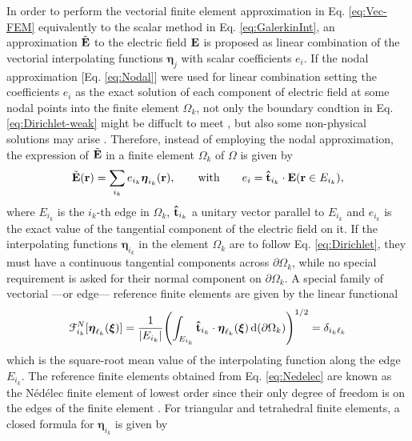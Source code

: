 
 In order to perform the vectorial finite element approximation in Eq. \eqref{eq:Vec-FEM} equivalently to the scalar method in Eq. \eqref{eq:GalerkinInt}, an approximation $\tilde{\vb{E}}$ to the electric field $\vb{E}$ is proposed as linear combination of the vectorial interpolating functions $\boldsymbol{\eta}_j$ with scalar coefficients $e_i$. If the nodal approximation [Eq. \eqref{eq:Nodal}] were used for linear combination setting the coefficients $e_i$ as the exact solution of each component of  electric field at some nodal points into the finite element $\Omega_k$, not only the boundary condtion in Eq. \eqref{eq:Dirichlet-weak} might be diffuclt to meet \cite{larson_finite_2013,jin_theory_2010}, but also  some non-physical solutions may arise \cite{bondeson_computational_2005}. Therefore, instead of employing the nodal approximation, the expression of $\tilde{\vb{E}}$ in a finite element $\Omega_k$ of $\Omega$ is given by \cite{larson_finite_2013}
%
\begin{align}
    \tilde{\vb{E}}(\vb{r}) = \sum_{i_k} e_{i_k} \boldsymbol{\eta}_{i_k}(\vb{r}),
        \qquad
        \text{with}
        \qquad
    e_{i} = \vu{t}_{i_k}\cdot \vb{E}(\vb{r}\in E_{i_k}),
\end{align}
%
where $E_{i_k}$ is the ${i_k}$-th edge in $\Omega_k$, $\vu{t}_{i_k}$ a unitary vector  parallel to $E_{i_k}$ and $e_{i_k}$ is the exact value of the tangential component of the electric field on it. If the interpolating functions  $\boldsymbol{\eta}_{i_k}$ in the element $\Omega_k$ are to follow Eq. \eqref{eq:Dirichlet}, they  must have a continuous tangential components across $\partial\Omega_k$, while no special requirement is asked for their normal component on $\partial\Omega_k$. A special family of vectorial ---or edge--- reference finite elements are given by the linear functional \cite{larson_finite_2013}
%
\begin{align}
    \mathcal{F}^{N}_{i_k}[\boldsymbol{\eta}_{\ell_k}(\boldsymbol{\xi})] = \frac{1}{\abs{E_{i_k}}}\qty(\int_{E_{i_k}} \vu{t}_{i_k}\cdot\boldsymbol{\eta}_{\ell_k}(\boldsymbol{\xi})   \dd{(\partial\Omega_k)} )^{1/2}  = \delta_{{i_k}{\ell_k}}
    \label{eq:Nedelec}
\end{align}
%
which is the square-root mean value of the interpolating function along the edge $E_{i_k}$. The reference finite elements obtained from Eq. \eqref{eq:Nedelec} are known as the Nédélec finite element of lowest order since their only degree of freedom is on the edges of the finite element \cite{bergot_generation_2010}. For triangular and tetrahedral finite elements, a closed formula for $\boldsymbol{\eta}_{i_k}$ is given by \cite{jin_theory_2010,larson_finite_2013,bondeson_computational_2005}
